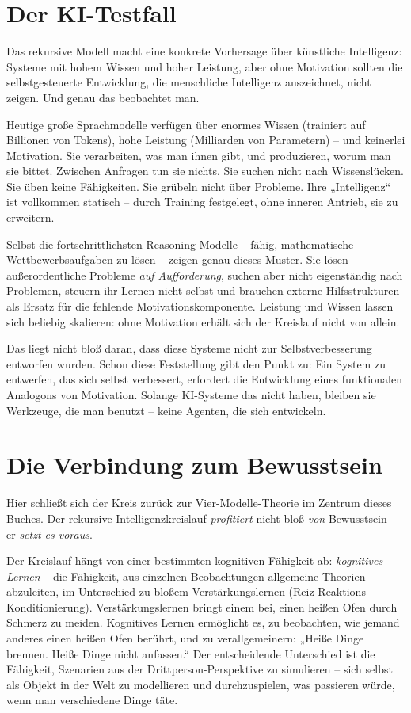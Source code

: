 \documentclass[11pt, twoside, openright]{book}
\begin{document}
\section*{Der KI-Testfall}

Das rekursive Modell macht eine konkrete Vorhersage über künstliche Intelligenz: Systeme mit hohem Wissen und hoher Leistung, aber ohne Motivation sollten die selbstgesteuerte Entwicklung, die menschliche Intelligenz auszeichnet, nicht zeigen. Und genau das beobachtet man.

Heutige große Sprachmodelle verfügen über enormes Wissen (trainiert auf Billionen von Tokens), hohe Leistung (Milliarden von Parametern) -- und keinerlei Motivation. Sie verarbeiten, was man ihnen gibt, und produzieren, worum man sie bittet. Zwischen Anfragen tun sie nichts. Sie suchen nicht nach Wissenslücken. Sie üben keine Fähigkeiten. Sie grübeln nicht über Probleme. Ihre „Intelligenz“ ist vollkommen statisch -- durch Training festgelegt, ohne inneren Antrieb, sie zu erweitern.

Selbst die fortschrittlichsten Reasoning-Modelle -- fähig, mathematische Wettbewerbsaufgaben zu lösen -- zeigen genau dieses Muster. Sie lösen außerordentliche Probleme \textit{auf Aufforderung}, suchen aber nicht eigenständig nach Problemen, steuern ihr Lernen nicht selbst und brauchen externe Hilfsstrukturen als Ersatz für die fehlende Motivationskomponente. Leistung und Wissen lassen sich beliebig skalieren: ohne Motivation erhält sich der Kreislauf nicht von allein.

Das liegt nicht bloß daran, dass diese Systeme nicht zur Selbstverbesserung entworfen wurden. Schon diese Feststellung gibt den Punkt zu: Ein System zu entwerfen, das sich selbst verbessert, erfordert die Entwicklung eines funktionalen Analogons von Motivation. Solange KI-Systeme das nicht haben, bleiben sie Werkzeuge, die man benutzt -- keine Agenten, die sich entwickeln.

\section*{Die Verbindung zum Bewusstsein}

Hier schließt sich der Kreis zurück zur Vier-Modelle-Theorie im Zentrum dieses Buches. Der rekursive Intelligenzkreislauf \textit{profitiert} nicht bloß \textit{von} Bewusstsein -- er \textit{setzt es voraus}.

Der Kreislauf hängt von einer bestimmten kognitiven Fähigkeit ab: \textit{kognitives Lernen} -- die Fähigkeit, aus einzelnen Beobachtungen allgemeine Theorien abzuleiten, im Unterschied zu bloßem Verstärkungslernen (Reiz-Reaktions-Konditionierung). Verstärkungslernen bringt einem bei, einen heißen Ofen durch Schmerz zu meiden. Kognitives Lernen ermöglicht es, zu beobachten, wie jemand anderes einen heißen Ofen berührt, und zu verallgemeinern: „Heiße Dinge brennen. Heiße Dinge nicht anfassen.“ Der entscheidende Unterschied ist die Fähigkeit, Szenarien aus der Drittperson-Perspektive zu simulieren -- sich selbst als Objekt in der Welt zu modellieren und durchzuspielen, was passieren würde, wenn man verschiedene Dinge täte.
\end{document}
